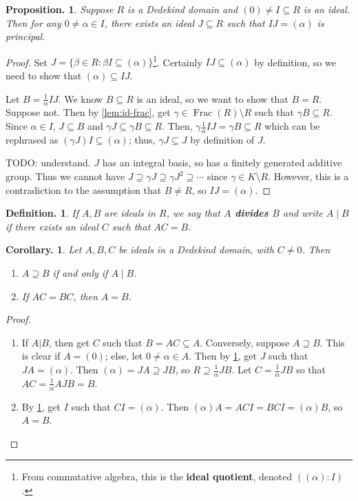 \documentclass[11pt, a4paper]{memoir}
\theoremstyle{change}
\newtheorem{corollary}[theorem]{Corollary.}
\newtheorem{proposition}[theorem]{Proposition.}
\theoremstyle{plain}
\theoremstyle{nonumberplain}
\newtheorem{definition}{Definition.}
\newtheorem{proof}{Proof}
\DeclareMathOperator{\Frac}{Frac}
\newcommand{\mbf}[1]{{\boldmath\bfseries #1}}
\numberwithin{equation}{section}
\begin{document}
\begin{proposition}\label{prop:id-inv}
    Suppose $R$ is a Dedekind domain and $(0)\neq I\subseteq R$ is an ideal.
    Then for any $0\neq \alpha\in I$, there exists an ideal $J\subseteq R$ such that $IJ=(\alpha)$ is principal.
\end{proposition}
\begin{proof}
    Set $J=\{\beta\in R:\beta I\subseteq(\alpha)\}$\footnote{From commutative algebra, this is the \textbf{ideal quotient}, denoted $((\alpha):I)$.}.
    Certainly $IJ\subseteq(\alpha)$ by definition, so we need to show that $(\alpha)\subseteq IJ$.

    Let $B=\frac{1}{\alpha}IJ$.
    We know $B\subseteq R$ is an ideal, so we want to show that $B=R$.
    Suppose not.
    Then by \cref{lem:id-frac}, get $\gamma\in \Frac(R)\setminus R$ such that $\gamma B\subseteq R$.
    Since $\alpha\in I$, $J\subseteq B$ and $\gamma J\subseteq\gamma B\subseteq R$.
    Then, $\gamma\frac{1}{\alpha} IJ=\gamma B\subseteq R$ which can be rephrased as $(\gamma J)I\subseteq(\alpha)$; thus, $\gamma J\subseteq J$ by definition of $J$.

    TODO: understand.
    $J$ has an integral basis, so has a finitely generated additive group.
    Thus we cannot have $J\supseteq\gamma J\supseteq\gamma J^2\supseteq\cdots$ since $\gamma\in K\setminus R$.
    However, this is a contradiction to the assumption that $B\neq R$, so $IJ=(\alpha)$.
\end{proof}
\begin{definition}
    If $A,B$ are ideals in $R$, we say that \mbf{$A$ divides $B$} and write $A\mid B$ if there exists an ideal $C$ such that $AC=B$.
\end{definition}
\begin{corollary}\label{cor:id-div}
    Let $A,B,C$ be ideals in a Dedekind domain, with $C\neq 0$.
    Then
    \begin{enumerate}[nolistsep,label=(\roman*)]
        \item $A\supseteq B$ if and only if $A\mid B$.
        \item If $AC=BC$, then $A=B$.
    \end{enumerate}
\end{corollary}
\begin{proof}
    \begin{enumerate}[label=(\roman*)]
        \item If $A|B$, then get $C$ such that $B=AC\subseteq A$.
            Conversely, suppose $A\supseteq B$.
            This is clear if $A=(0)$; else, let $0\neq\alpha\in A$.
            Then by \cref{prop:id-inv}, get $J$ such that $JA=(\alpha)$.
            Then $(\alpha)=JA\supseteq JB$, so $R\supseteq\frac{1}{\alpha}JB$.
            Let $C=\frac{1}{\alpha}JB$ so that $AC=\frac{1}{\alpha}AJB=B$.
        \item By \cref{prop:id-inv}, get $I$ such that $CI=(\alpha)$.
            Then $(\alpha)A=ACI=BCI=(\alpha)B$, so $A=B$.
    \end{enumerate}
\end{proof}
\end{document}
